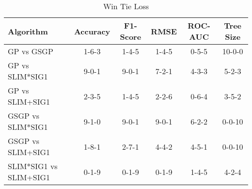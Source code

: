 
    \begin{table}[H]
        \centering
        \renewcommand{\arraystretch}{1.2}
        \caption{Win Tie Loss}
        \label{tab:RQ_Comparison_wtl}
    \begin{tabular}{lccccc}
\toprule
Algorithm & Accuracy & F1-Score & RMSE & ROC-AUC & Tree Size \\
\midrule
GP vs GSGP & 1-6-3 & 1-4-5 & 1-4-5 & 0-5-5 & 10-0-0 \\
GP vs SLIM*SIG1 & 9-0-1 & 9-0-1 & 7-2-1 & 4-3-3 & 5-2-3 \\
GP vs SLIM+SIG1 & 2-3-5 & 1-4-5 & 2-2-6 & 0-6-4 & 3-5-2 \\
GSGP vs SLIM*SIG1 & 9-1-0 & 9-0-1 & 9-0-1 & 6-2-2 & 0-0-10 \\
GSGP vs SLIM+SIG1 & 1-8-1 & 2-7-1 & 4-4-2 & 4-5-1 & 0-0-10 \\
SLIM*SIG1 vs SLIM+SIG1 & 0-1-9 & 0-1-9 & 0-1-9 & 1-4-5 & 4-2-4 \\
\bottomrule
\end{tabular}

        
    \end{table}
    